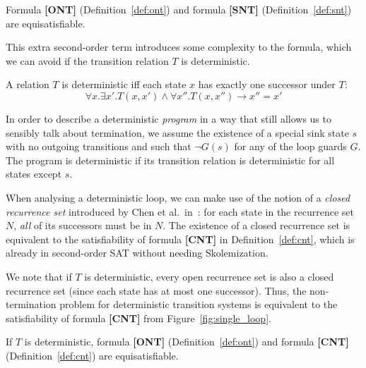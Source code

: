 \documentclass[a4paper]{llncs}
\begin{document}
\begin{theorem}
 \label{thm:snt}
 Formula {\bf [ONT]} (Definition~\ref{def:ont}) and formula {\bf [SNT]} (Definition~\ref{def:snt}) are equisatisfiable.
\end{theorem}


This extra second-order term introduces some complexity to the formula, which
we can avoid if the transition relation $T$ is deterministic.
\begin{definition}[Determinism]
 A relation $T$ is deterministic iff each state $x$ has exactly one successor under $T$:
 $$\forall x . \exists x' . T(x, x') \wedge \forall x'' . T(x, x'') \rightarrow x'' = x'$$
\end{definition}
In order to describe a deterministic \emph{program} in a way that still allows us
to sensibly talk about termination, we assume the existence of a special sink
state $s$ with no outgoing transitions and such that $\lnot G(s)$ for any
of the loop guards $G$.  The program is deterministic if its transition
relation is deterministic for all states except $s$.

When analysing a deterministic loop, we can make use of the notion of a \emph{closed recurrence set}
introduced by Chen et al.~in~\cite{DBLP:conf/tacas/ChenCFNO14}:  for each
state in the recurrence set $N$, \emph{all} of its successors must be in $N$.
The existence of a closed recurrence set is equivalent to the satisfiability
of formula {\bf [CNT]} in Definition~\ref{def:cnt}, which is already in second-order SAT without needing Skolemization.

We note that if $T$ is deterministic, every open recurrence set is also a
closed recurrence set (since each state has at most one successor).  Thus,
the non-termination problem for deterministic transition systems is
equivalent to the satisfiability of formula {\bf [CNT]} from Figure~\ref{fig:single_loop}.


\begin{theorem}
\label{thm:cnt}
 If $T$ is deterministic,
formula {\bf [ONT]} (Definition~\ref{def:ont}) and formula {\bf [CNT]} (Definition~\ref{def:cnt}) are equisatisfiable.
\end{theorem}

%  
\end{document}
